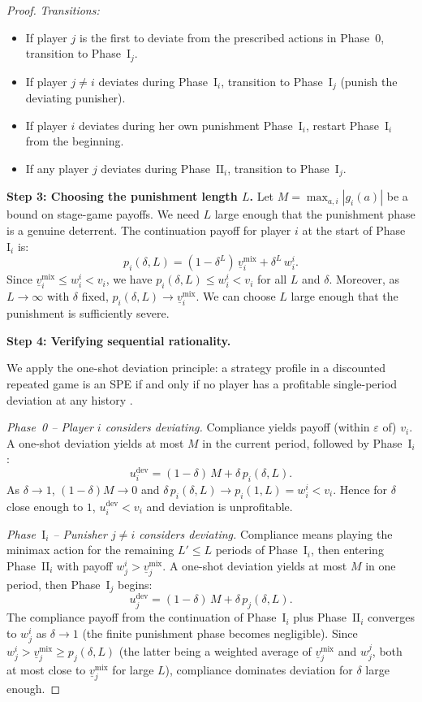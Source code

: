 \documentclass[11pt,a4paper]{article}
\begin{document}
\begin{proof}
\emph{Transitions:}
\begin{itemize}
    \item If player $j$ is the first to deviate from the prescribed actions
    in Phase~0, transition to Phase~$\mathrm{I}_j$.
    \item If player $j \neq i$ deviates during Phase~$\mathrm{I}_i$,
    transition to Phase~$\mathrm{I}_j$ (punish the deviating punisher).
    \item If player $i$ deviates during her own punishment
    Phase~$\mathrm{I}_i$, restart Phase~$\mathrm{I}_i$ from the
    beginning.
    \item If any player $j$ deviates during Phase~$\mathrm{II}_i$,
    transition to Phase~$\mathrm{I}_j$.
\end{itemize}

\textbf{Step 3: Choosing the punishment length $L$.}
Let $M = \max_{a,i} |g_i(a)|$ be a bound on stage-game payoffs. We need
$L$ large enough that the punishment phase is a genuine deterrent. The
continuation payoff for player $i$ at the start of Phase~$\mathrm{I}_i$ is:
\[
    p_i(\delta, L) = (1 - \delta^L)\, \underline{v}_i^{\mathrm{mix}}
    + \delta^L\, w^i_i.
\]
Since $\underline{v}_i^{\mathrm{mix}} \leq w^i_i < v_i$, we have
$p_i(\delta, L) \leq w^i_i < v_i$ for all $L$ and $\delta$. Moreover, as
$L \to \infty$ with $\delta$ fixed, $p_i(\delta, L) \to
\underline{v}_i^{\mathrm{mix}}$. We can choose $L$ large enough that the
punishment is sufficiently severe.

\textbf{Step 4: Verifying sequential rationality.}

We apply the one-shot deviation principle: a strategy profile in a
discounted repeated game is an SPE if and only if no player has a
profitable single-period deviation at any history
\citep{fudenberg1991}.

\emph{Phase~0 -- Player $i$ considers deviating.}
Compliance yields payoff (within $\varepsilon$ of) $v_i$. A one-shot
deviation yields at most $M$ in the current period, followed by
Phase~$\mathrm{I}_i$:
\[
    u_i^{\mathrm{dev}} = (1-\delta)\, M + \delta\, p_i(\delta, L).
\]
As $\delta \to 1$, $(1-\delta)M \to 0$ and $\delta\, p_i(\delta, L) \to
p_i(1, L) = w^i_i < v_i$. Hence for $\delta$ close enough to $1$,
$u_i^{\mathrm{dev}} < v_i$ and deviation is unprofitable.

\emph{Phase~$\mathrm{I}_i$ -- Punisher $j \neq i$ considers deviating.}
Compliance means playing the minimax action for the remaining
$L' \leq L$ periods of Phase~$\mathrm{I}_i$, then entering
Phase~$\mathrm{II}_i$ with payoff $w^i_j >
\underline{v}_j^{\mathrm{mix}}$. A one-shot deviation yields at most $M$
in one period, then Phase~$\mathrm{I}_j$ begins:
\[
    u_j^{\mathrm{dev}} = (1-\delta)\, M + \delta\, p_j(\delta, L).
\]
The compliance payoff from the continuation of Phase~$\mathrm{I}_i$ plus
Phase~$\mathrm{II}_i$ converges to $w^i_j$ as $\delta \to 1$ (the
finite punishment phase becomes negligible). Since
$w^i_j > \underline{v}_j^{\mathrm{mix}} \geq p_j(\delta, L)$ (the
latter being a weighted average of $\underline{v}_j^{\mathrm{mix}}$ and
$w^j_j$, both at most close to $\underline{v}_j^{\mathrm{mix}}$ for
large $L$), compliance dominates deviation for $\delta$ large enough.


\end{proof}
\end{document}
